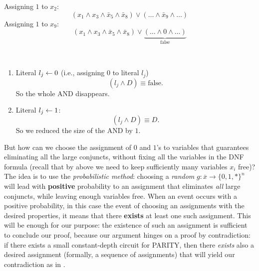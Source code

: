 Assigning $1$ to $x_2$:
\[
(x_1 \wedge x_3 \wedge \bar{x}_5 \wedge \bar{x}_8) \vee ( \dots \wedge \bar{x}_9 \wedge \dots )
\]
Assigning $1$ to $x_9$:
\[
(x_1 \wedge x_3 \wedge \bar{x}_5 \wedge \bar{x}_8) \vee \underbrace{( \dots\wedge 0 \wedge \dots)}_{\text{false}} 
\]





\begin{note}\
\begin{enumerate}
    \item Literal $l_j \leftarrow 0$ (i.e., assigning $0$ to literal $l_j$)
    \[
        (l_j \wedge D) \equiv \text{false}.
    \]
    So the whole AND disappears.
    
    \item Literal $l_j \leftarrow 1$:
    \[
        (l_j \wedge D) \equiv D.
    \]
    So we reduced the size of the AND by $1$.
\end{enumerate}
\end{note}

But how can we choose the assignment of $0$ and $1$'s to variables that guarantees eliminating all the large conjuncts, without fixing all the variables in the DNF formula (recall that by  above we need to keep sufficiently many variables $x_i$ free)?
The idea is to use the \emph{probabilistic method}: choosing a \emph{random} $g: \overline x \to \{0,1, *\}^n$ will lead with \textbf{positive} probability to an assignment that eliminates \emph{all} large conjuncts, while leaving enough variables free. When an event occurs with a positive probability, in this case the event of choosing an assignments with the desired properties, it means that there \textbf{exists} at least one such assignment. This will be enough for our purpose: the existence of such an assignment is sufficient to conclude our proof, because our argument hinges on a proof by contradiction: if there exists a small constant-depth circuit for PARITY, then there \emph{exists} also a desired assignment (formally, a sequence of assignments) that will yield our contradiction as in .


